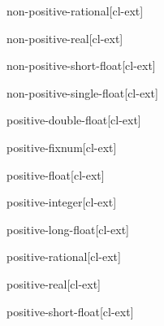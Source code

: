 \documentclass[10pt,english]{book}
\begin{document}
\begin{type}{non-positive-rational}{}[cl-ext]
  
\end{type}

\begin{type}{non-positive-real}{}[cl-ext]
  
\end{type}

\begin{type}{non-positive-short-float}{}[cl-ext]
  
\end{type}

\begin{type}{non-positive-single-float}{}[cl-ext]
  
\end{type}

\begin{type}{positive-double-float}{}[cl-ext]
  
\end{type}

\begin{type}{positive-fixnum}{}[cl-ext]
  
\end{type}

\begin{type}{positive-float}{}[cl-ext]
  
\end{type}

\begin{type}{positive-integer}{}[cl-ext]
  
\end{type}

\begin{type}{positive-long-float}{}[cl-ext]
  
\end{type}

\begin{type}{positive-rational}{}[cl-ext]
  
\end{type}

\begin{type}{positive-real}{}[cl-ext]
  
\end{type}

\begin{type}{positive-short-float}{}[cl-ext]
  
\end{type}
\end{document}
